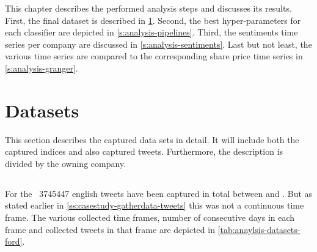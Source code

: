 
\newcommand{\indicesCaption}[1]{Indices of #1 within the evaluation time frame}
\newcommand{\resultsCaption}[1]{Summarized and normalized sentiment values of #1 within the evaluation time frame}
\newcommand{\tweetsCaption}[1]{Collection time frames of tweets for #1}
\newcommand{\confusionCaption}[1]{Confusion matrix of classifier #1}
\newcommand{\hyperCaption}[1]{Determined hyper-parameters for pipeline of classifier #1}

This chapter describes the performed analysis steps and discusses its results.
First, the final dataset is described in \cref{s:analysis-datasets}.
Second, the best hyper-parameters for each classifier are depicted in \cref{s:analysis-pipelines}.
Third, the sentiments time series per company are discussed in \cref{s:analysis-sentiments}.
Last but not least, the various time series are compared to the corresponding share price time series in \cref{s:analysis-granger}.

\section{Datasets}
\label{s:analysis-datasets}

This section describes the captured data sets in detail.
It will include both the captured indices and also captured tweets.
Furthermore, the description is divided by the owning company.

\subsection{\ford}
\label{ss:analysis-datasets-ford}


For the \ford\ \num{3745447} english tweets have been captured in total between  and .
But as stated earlier in \cref{ss:casestudy-gatherdata-tweets} this was not a continuous time frame.
The various collected time frames, number of consecutive days in each frame and collected tweets in that frame are depicted in \cref{tab:anaylsis-datasets-ford}.

